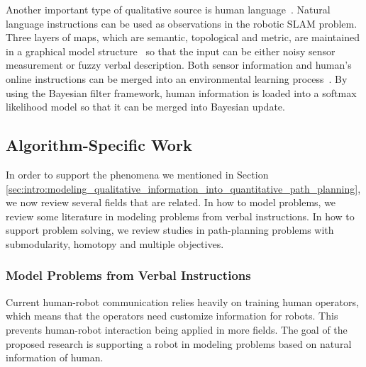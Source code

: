 \documentclass[phd]{byuprop}
\begin{document}
Another important type of qualitative source is human language~\cite{tellex2011understanding,walter2014framework}.
Natural language instructions can be used as observations in the robotic SLAM problem.
Three layers of maps, which are semantic, topological and metric, are maintained in a graphical model structure~\cite{walter2014framework} so that the input can be either noisy sensor measurement or fuzzy verbal description.
Both sensor information and human's online instructions can be merged into an environmental learning process~\cite{6301744,5509521,ahmed2014enabling}.
By using the Bayesian filter framework, human information is loaded into a softmax likelihood model so that it can be merged into Bayesian update.

\subsection{Algorithm-Specific Work} 
\label{sec:related_work:algorithm_specific_work}

In order to support the phenomena we mentioned in Section \ref{sec:intro:modeling_qualitative_information_into_quantitative_path_planning}, we now review several fields that are related.
In how to model problems, we review some literature in modeling problems from verbal instructions.
In how to support problem solving, we review studies in path-planning problems with submodularity, homotopy and multiple objectives.

\subsubsection{Model Problems from Verbal Instructions}
\label{sec:related_work:algorithm_specific_work:model_problems_from_verbal_instructions}

Current human-robot communication relies heavily on training human operators, which means that the operators need customize information for robots.
This prevents human-robot interaction being applied in more fields.
The goal of the proposed research is supporting a robot in modeling problems based on natural information of human.
\end{document}
